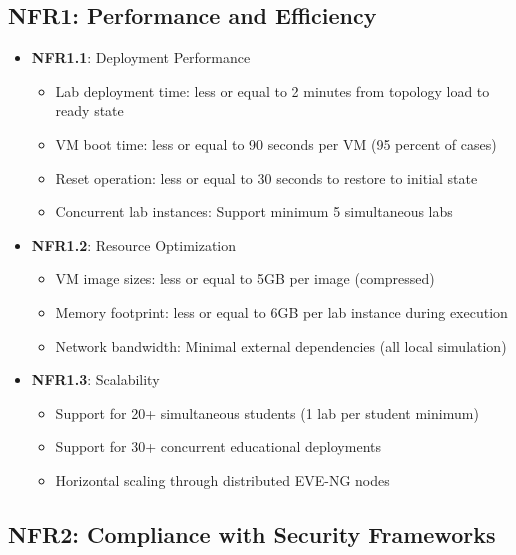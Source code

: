 \subsection{NFR1: Performance and Efficiency}

\begin{itemize}

\item \textbf{NFR1.1}: Deployment Performance
\begin{itemize}
\item Lab deployment time: less or equal to 2 minutes from topology load to ready state
\item VM boot time: less or equal to 90 seconds per VM (95 percent of cases)
\item Reset operation: less or equal to 30 seconds to restore to initial state
\item Concurrent lab instances: Support minimum 5 simultaneous labs
\end{itemize}

\item \textbf{NFR1.2}: Resource Optimization
\begin{itemize}
\item VM image sizes: less or equal to 5GB per image (compressed)
\item Memory footprint: less or equal to 6GB per lab instance during execution
\item Network bandwidth: Minimal external dependencies (all local simulation)
\end{itemize}

\item \textbf{NFR1.3}: Scalability
\begin{itemize}
\item Support for 20+ simultaneous students (1 lab per student minimum)
\item Support for 30+ concurrent educational deployments
\item Horizontal scaling through distributed EVE-NG nodes
\end{itemize}

\end{itemize}

\subsection{NFR2: Compliance with Security Frameworks}

